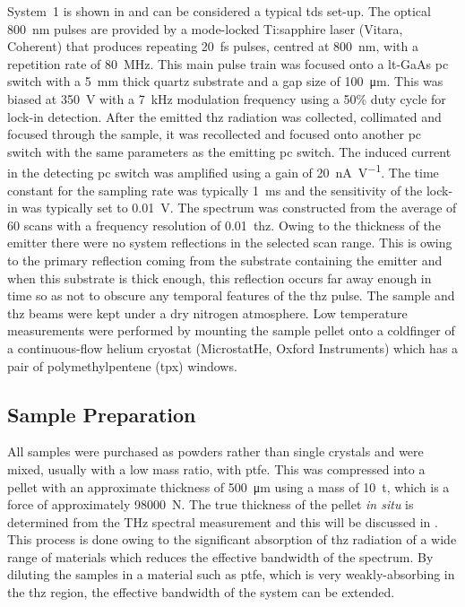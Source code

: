 System~1 is shown in  and can be considered a typical \acrshort{tds} set\nobreakdash-up. The optical \SI{800}{nm} pulses are provided by a mode-locked Ti:sapphire laser (Vitara, Coherent) that produces repeating \SI{20}{fs} pulses, centred at \SI{800}{nm}, with a repetition rate of \SI{80}{MHz}. This main pulse train was focused onto a \acrshort{lt}\nobreakdash-GaAs \acrshort{pc} switch with a \SI{5}{mm} thick quartz substrate and a gap size of \SI{100}{\micro\metre}. This was biased at \SI{350}{V} with a \SI{7}{kHz} modulation frequency using a 50\% duty cycle for lock-in detection. After the emitted \acrshort{thz} radiation was collected, collimated and focused through the sample, it was recollected and focused onto another \acrshort{pc} switch with the same parameters as the emitting \acrshort{pc} switch. The induced current in the detecting \acrshort{pc} switch was amplified using a gain of \SI{20}{\unit{\nA.\V^{-1}}}. The time constant for the sampling rate was typically \SI{1}{ms} and the sensitivity of the lock\nobreakdash-in was typically set to \SI{0.01}{V}. The spectrum was constructed from the average of 60 scans with a frequency resolution of \SI{0.01}{\acrshort{thz}}. Owing to the thickness of the emitter there were no system reflections in the selected scan range. This is owing to the primary reflection coming from the substrate containing the emitter and when this substrate is thick enough, this reflection occurs far away enough in time so as not to obscure any temporal features of the \acrshort{thz} pulse. The sample and \acrshort{thz} beams were kept under a dry nitrogen atmosphere. Low temperature measurements were performed by mounting the sample pellet onto a coldfinger of a continuous\nobreakdash-flow helium cryostat (MicrostatHe, Oxford Instruments) which has a pair of polymethylpentene (\acrshort{tpx}) windows.

\subsection{Sample Preparation}
All samples were purchased as powders rather than single crystals and were mixed, usually with a low mass ratio, with \acrfull{ptfe}. This was compressed into a pellet with an approximate thickness of \SI{500}{\micro\metre} using a mass of \SI{10}{\tonne}, which is a force of approximately \SI{98000}{N}. The true thickness of the pellet \textit{in situ} is determined from the THz spectral measurement and this will be discussed in . This process is done owing to the significant absorption of \acrshort{thz} radiation of a wide range of materials which reduces the effective bandwidth of the spectrum. By diluting the samples in a material such as \acrshort{ptfe}, which is very weakly\nobreakdash-absorbing in the \acrshort{thz} region, the effective bandwidth of the system can be extended. 


